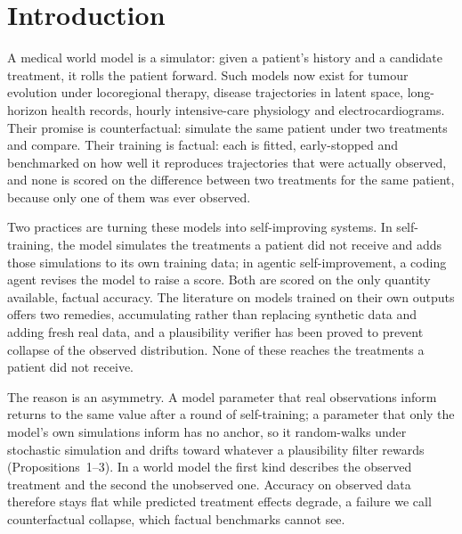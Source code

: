 \documentclass[11pt,a4paper]{article}
\begin{document}
\section{Introduction}
A medical world model is a simulator: given a patient's history and a candidate treatment, it rolls the patient forward. Such models now exist for tumour evolution under locoregional therapy, disease trajectories in latent space, long-horizon health records, hourly intensive-care physiology and electrocardiograms\cite{yang2025mewm,ding2026clarity,mu2026ehrworld,clinjepa2026,chen2026ecgwm,medwmsurvey2026}. Their promise is counterfactual: simulate the same patient under two treatments and compare. Their training is factual: each is fitted, early-stopped and benchmarked on how well it reproduces trajectories that were actually observed, and none is scored on the difference between two treatments for the same patient, because only one of them was ever observed.

Two practices are turning these models into self-improving systems. In self-training, the model simulates the treatments a patient did not receive and adds those simulations to its own training data; in agentic self-improvement, a coding agent revises the model to raise a score\cite{xu2026meddreamer,agentify2026}. Both are scored on the only quantity available, factual accuracy. The literature on models trained on their own outputs offers two remedies, accumulating rather than replacing synthetic data and adding fresh real data\cite{shumailov2024,gerstgrasser2024}, and a plausibility verifier has been proved to prevent collapse of the observed distribution\cite{fu2025selfverification}. None of these reaches the treatments a patient did not receive.

The reason is an asymmetry. A model parameter that real observations inform returns to the same value after a round of self-training; a parameter that only the model's own simulations inform has no anchor, so it random-walks under stochastic simulation and drifts toward whatever a plausibility filter rewards (Propositions~1--3). In a world model the first kind describes the observed treatment and the second the unobserved one. Accuracy on observed data therefore stays flat while predicted treatment effects degrade, a failure we call counterfactual collapse, which factual benchmarks cannot see.
\end{document}
